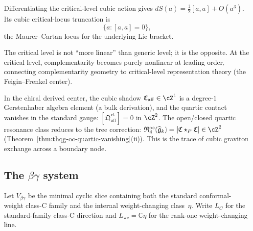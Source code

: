\begin{remark}
Differentiating the critical-level cubic action gives
$dS(a)=\frac12[a,a]+O(a^3)$. Its cubic critical-locus truncation is
\[
\{a:[a,a]=0\},
\]
the Maurer--Cartan locus for the underlying Lie bracket.
\end{remark}

\begin{remark}
\label{rem:nms-critical-purely-nonlinear}
The critical level is not ``more linear'' than generic level; it is the opposite. At the critical level, complementarity becomes purely nonlinear at leading order, connecting complementarity geometry to critical-level representation theory (the Feigin--Frenkel center).
\end{remark}

\begin{remark}
\label{rem:nms-affine-derived-center}
In the chiral derived center, the cubic shadow
$\mathfrak{C}_{\mathrm{aff}} \in \cZ^1$ is a degree-$1$
Gerstenhaber algebra element (a bulk derivation), and the quartic
contact vanishes in the standard gauge:
$[\mathfrak{Q}^{\mathrm{ct}}_{\mathrm{aff}}] = 0$ in $\cZ^2$.
The open/closed quartic resonance class reduces to the tree correction:
$\mathfrak{R}^{\mathrm{oc}}_4(\widehat{\mathfrak{g}}_k)
= [\mathfrak{C} \star_{P} \mathfrak{C}] \in \cZ^2$
(Theorem~\ref{thm:thqg-oc-quartic-vanishing}(ii)).
This is the trace of cubic graviton exchange across a boundary node.
\end{remark}

\subsection{The \texorpdfstring{$\beta\gamma$}{betagamma} system}
\label{subsec:nms-betagamma}

\begin{definition}
\label{def:nms-betagamma-slice}
Let $V_{\beta\gamma}$ be the minimal cyclic slice containing both the
standard conformal-weight class-C family and the internal
weight-changing class~$\eta$. Write $L_C$ for the standard-family
class-C direction and $L_{\mathrm{wc}}=\mathbb C\eta$ for the
rank-one weight-changing line.
\end{definition}

